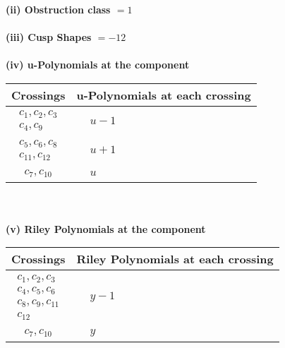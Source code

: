 \documentclass[1p]{elsarticle_modified}
\theoremstyle{definition}
\begin{document}
\flushleft \textbf{(ii) Obstruction class $= 1$}\\~\\
\flushleft \textbf{(iii) Cusp Shapes $= -12$}\\~\\
\newpage\renewcommand{\arraystretch}{1}
\flushleft \textbf{(iv) u-Polynomials at the component}\newline \\
\begin{tabular}{m{50pt}|m{274pt}}
Crossings & \hspace{64pt}u-Polynomials at each crossing \\
\hline $$\begin{aligned}c_{1},c_{2},c_{3}\\c_{4},c_{9}\end{aligned}$$&$\begin{aligned}
&u-1
\end{aligned}$\\
\hline $$\begin{aligned}c_{5},c_{6},c_{8}\\c_{11},c_{12}\end{aligned}$$&$\begin{aligned}
&u+1
\end{aligned}$\\
\hline $$\begin{aligned}c_{7},c_{10}\end{aligned}$$&$\begin{aligned}
&u
\end{aligned}$\\
\hline
\end{tabular}\\~\\
\newpage\renewcommand{\arraystretch}{1}
\flushleft \textbf{(v) Riley Polynomials at the component}\newline \\
\begin{tabular}{m{50pt}|m{274pt}}
Crossings & \hspace{64pt}Riley Polynomials at each crossing \\
\hline $$\begin{aligned}c_{1},c_{2},c_{3}\\c_{4},c_{5},c_{6}\\c_{8},c_{9},c_{11}\\c_{12}\end{aligned}$$&$\begin{aligned}
&y-1
\end{aligned}$\\
\hline $$\begin{aligned}c_{7},c_{10}\end{aligned}$$&$\begin{aligned}
&y
\end{aligned}$\\
\hline
\end{tabular}\\~\\
\end{document}
